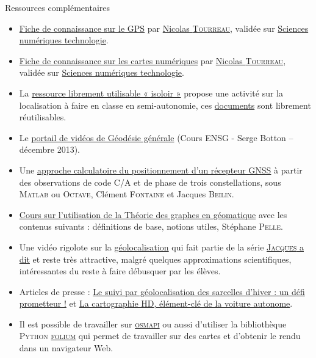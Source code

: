 \begin{gofurther}{Ressources complémentaires}
\vspace{2pt}
\begin{itemize}\jazzitem
\item \href{./Documents/Chapter08/cardVIII-23-snt-gps-nicolas-tourreau.odt}{Fiche de connaissance sur le GPS} par \href{mailto://ntourreau@ac-toulouse.fr}{Nicolas \textsc{Tourreau}}, validée sur \href{mailto://sciences-numeriques-technologie@groupes.renater.fr}{Sciences numériques technologie}.
\item \href{./Documents/Chapter08/cardVIII-24-snt-map-nicolas-tourreau.odt}{Fiche de connaissance sur les cartes numériques} par \href{mailto://ntourreau@ac-toulouse.fr}{Nicolas \textsc{Tourreau}}, validée sur \href{mailto://sciences-numeriques-technologie@groupes.renater.fr}{Sciences numériques technologie}.
\item La \href{https://www.isoloir.net/}{ressource librement utilisable « isoloir »} propose une activité sur la localisation à faire en classe en semi-autonomie, ces \href{https://pixees.fr/informatique-et-societe-du-jeu-serieux-au-document-pedagogique/}{documents} sont librement réutilisables.
\item Le \href{https://streaming.ensg.eu/geodesie/portail/co/portail.html}{portail de vidéos de Géodésie générale} (Cours ENSG - Serge Botton – décembre 2013).
\item Une \href{http://cours-fad-public.ensg.eu/course/view.php?id=86}{approche calculatoire du positionnement d'un récepteur GNSS} à partir des observations de code C/A et de phase de trois constellations, sous \textsc{Matlab} ou \textsc{Octave}, Clément \textsc{Fontaine} et Jacques \textsc{Beilin}.
\item \href{http://cours-fad-public.ensg.eu/course/view.php?id=73}{Cours sur l'utilisation de la Théorie des graphes en géomatique} avec les contenus suivants : définitions de base, notions utiles, Stéphane \textsc{Pelle}.
\item Une vidéo rigolote sur la \href{https://leblob.fr/techno/la-geolocalisation}{géolocalisation} qui fait partie de la série \href{https://leblob.fr/series/jacques-dit}{\textsc{Jacques} a dit} et reste très attractive, malgré quelques approximations scientifiques, intéressantes du reste à faire débusquer par les élèves.
\item Articles de presse : \href{http://www.isnea.eu/le-suivi-par-gelocalisation-des-sarcelles-dhiver-un-defi-prometteur/}{Le suivi par géolocalisation des sarcelles d’hiver : un défi prometteur !} et \href{https://www.lesnumeriques.com/voiture/cartographie-hd-element-cle-voiture-autonome-a3501.html}{La cartographie HD, élément-clé de la voiture autonome}.
\item Il est possible de travailler sur \href{https://pypi.org/project/osmapi/}{\textsc{osmapi}} ou aussi d'utiliser la bibliothèque \textsc{Python} \href{https://github.com/python-visualization/folium}{\textsc{folium}} qui permet de travailler sur des cartes et d'obtenir le rendu dans un navigateur Web.
\end{itemize}
\end{gofurther}


